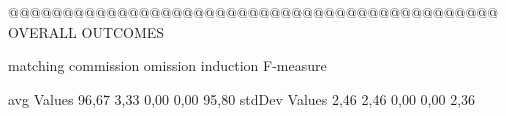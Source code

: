  @@@@@@@@@@@@@@@@@@@@@@@@@@@@@@@@@@@@@@@@@@@@@ OVERALL OUTCOMES

                matching commission   omission  induction   F-measure

avg Values      96,67       3,33       0,00       0,00       95,80        
stdDev Values    2,46       2,46       0,00       0,00        2,36        

